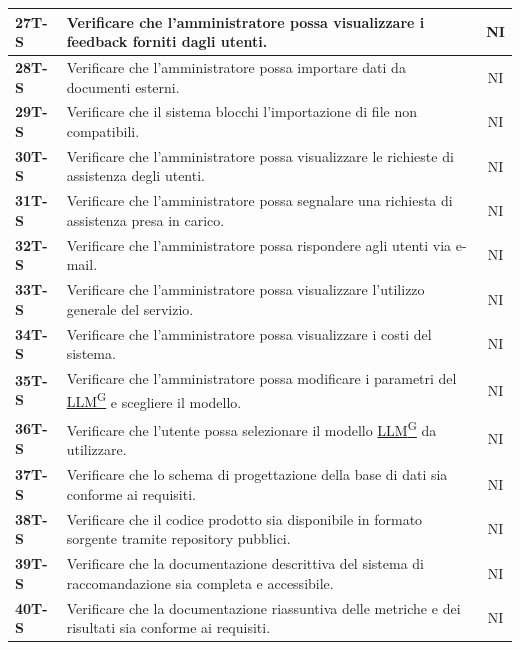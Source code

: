 \documentclass{article}
\begin{document}
\begin{longtable}{|>{\centering\arraybackslash}m{}|>{\raggedright\arraybackslash}m{}|c|}
    \hline
    \textbf{27T-S} & Verificare che l’amministratore possa visualizzare i feedback forniti dagli utenti. & NI \\
    \hline
    \textbf{28T-S} & Verificare che l’amministratore possa importare dati da documenti esterni. & NI \\
    \hline
    \textbf{29T-S} & Verificare che il sistema blocchi l’importazione di file non compatibili. & NI \\
    \hline
    \textbf{30T-S} & Verificare che l’amministratore possa visualizzare le richieste di assistenza degli utenti. & NI \\
    \hline
    \textbf{31T-S} & Verificare che l’amministratore possa segnalare una richiesta di assistenza presa in carico. & NI \\
    \hline
    \textbf{32T-S} & Verificare che l’amministratore possa rispondere agli utenti via e-mail. & NI \\
    \hline
    \textbf{33T-S} & Verificare che l’amministratore possa visualizzare l’utilizzo generale del servizio. & NI \\
    \hline
    \textbf{34T-S} & Verificare che l’amministratore possa visualizzare i costi del sistema. & NI \\
    \hline
    \textbf{35T-S} & Verificare che l’amministratore possa modificare i parametri del \href{https://code7crusaders.github.io/docs/RTB/documentazione_interna/glossario.html#llm-large-language-model}{LLM\textsuperscript{G}} e scegliere il modello. & NI \\
    \hline
    \textbf{36T-S} & Verificare che l’utente possa selezionare il modello \href{https://code7crusaders.github.io/docs/RTB/documentazione_interna/glossario.html#llm-large-language-model}{LLM\textsuperscript{G}} da utilizzare. & NI \\
    \hline
    \textbf{37T-S} & Verificare che lo schema di progettazione della base di dati sia conforme ai requisiti. & NI \\
    \hline
    \textbf{38T-S} & Verificare che il codice prodotto sia disponibile in formato sorgente tramite repository pubblici. & NI \\
    \hline
    \textbf{39T-S} & Verificare che la documentazione descrittiva del sistema di raccomandazione sia completa e accessibile. & NI \\
    \hline
    \textbf{40T-S} & Verificare che la documentazione riassuntiva delle metriche e dei risultati sia conforme ai requisiti. & NI \\
    \hline

\end{longtable}
\end{document}
